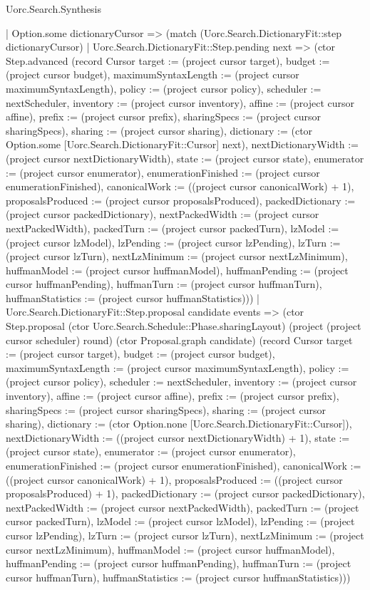 \begin{lexlean}{Uorc.Search.Synthesis}
\begin{semanticmodule}
{    | Option.some dictionaryCursor => (match (Uorc.Search.DictionaryFit::step dictionaryCursor)
      | Uorc.Search.DictionaryFit::Step.pending next => (ctor Step.advanced (record Cursor {target := (project cursor target), budget := (project cursor budget), maximumSyntaxLength := (project cursor maximumSyntaxLength), policy := (project cursor policy), scheduler := nextScheduler, inventory := (project cursor inventory), affine := (project cursor affine), prefix := (project cursor prefix), sharingSpecs := (project cursor sharingSpecs), sharing := (project cursor sharing), dictionary := (ctor Option.some [Uorc.Search.DictionaryFit::Cursor] next), nextDictionaryWidth := (project cursor nextDictionaryWidth), state := (project cursor state), enumerator := (project cursor enumerator), enumerationFinished := (project cursor enumerationFinished), canonicalWork := ((project cursor canonicalWork) + 1), proposalsProduced := (project cursor proposalsProduced), packedDictionary := (project cursor packedDictionary), nextPackedWidth := (project cursor nextPackedWidth), packedTurn := (project cursor packedTurn), lzModel := (project cursor lzModel), lzPending := (project cursor lzPending), lzTurn := (project cursor lzTurn), nextLzMinimum := (project cursor nextLzMinimum), huffmanModel := (project cursor huffmanModel), huffmanPending := (project cursor huffmanPending), huffmanTurn := (project cursor huffmanTurn), huffmanStatistics := (project cursor huffmanStatistics)}))
      | Uorc.Search.DictionaryFit::Step.proposal candidate events => (ctor Step.proposal (ctor Uorc.Search.Schedule::Phase.sharingLayout) (project (project cursor scheduler) round) (ctor Proposal.graph candidate) (record Cursor {target := (project cursor target), budget := (project cursor budget), maximumSyntaxLength := (project cursor maximumSyntaxLength), policy := (project cursor policy), scheduler := nextScheduler, inventory := (project cursor inventory), affine := (project cursor affine), prefix := (project cursor prefix), sharingSpecs := (project cursor sharingSpecs), sharing := (project cursor sharing), dictionary := (ctor Option.none [Uorc.Search.DictionaryFit::Cursor]), nextDictionaryWidth := ((project cursor nextDictionaryWidth) + 1), state := (project cursor state), enumerator := (project cursor enumerator), enumerationFinished := (project cursor enumerationFinished), canonicalWork := ((project cursor canonicalWork) + 1), proposalsProduced := ((project cursor proposalsProduced) + 1), packedDictionary := (project cursor packedDictionary), nextPackedWidth := (project cursor nextPackedWidth), packedTurn := (project cursor packedTurn), lzModel := (project cursor lzModel), lzPending := (project cursor lzPending), lzTurn := (project cursor lzTurn), nextLzMinimum := (project cursor nextLzMinimum), huffmanModel := (project cursor huffmanModel), huffmanPending := (project cursor huffmanPending), huffmanTurn := (project cursor huffmanTurn), huffmanStatistics := (project cursor huffmanStatistics)}))
}
\end{semanticmodule}
\end{lexlean}
